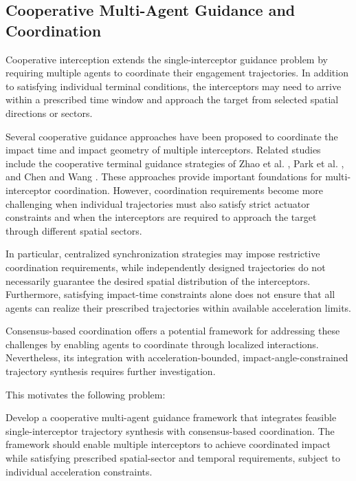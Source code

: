 \subsection{Cooperative Multi-Agent Guidance and Coordination}
\label{subsec:cooperative_guidance}

Cooperative interception extends the single-interceptor guidance problem by requiring multiple agents to coordinate their engagement trajectories. In addition to satisfying individual terminal conditions, the interceptors may need to arrive within a prescribed time window and approach the target from selected spatial directions or sectors.

Several cooperative guidance approaches have been proposed to coordinate the impact time and impact geometry of multiple interceptors. Related studies include the cooperative terminal guidance strategies of Zhao et al. \cite{zhao2015terminal}, Park et al. \cite{park2013optimal}, and Chen and Wang \cite{Chen2018AST}. These approaches provide important foundations for multi-interceptor coordination. However, coordination requirements become more challenging when individual trajectories must also satisfy strict actuator constraints and when the interceptors are required to approach the target through different spatial sectors.

In particular, centralized synchronization strategies may impose restrictive coordination requirements, while independently designed trajectories do not necessarily guarantee the desired spatial distribution of the interceptors. Furthermore, satisfying impact-time constraints alone does not ensure that all agents can realize their prescribed trajectories within available acceleration limits.

Consensus-based coordination offers a potential framework for addressing these challenges by enabling agents to coordinate through localized interactions. Nevertheless, its integration with acceleration-bounded, impact-angle-constrained trajectory synthesis requires further investigation.

This motivates the following problem:
\begin{problem}
Develop a cooperative multi-agent guidance framework that integrates feasible single-interceptor trajectory synthesis with consensus-based coordination. The framework should enable multiple interceptors to achieve coordinated impact while satisfying prescribed spatial-sector and temporal requirements, subject to individual acceleration constraints.
\end{problem}

